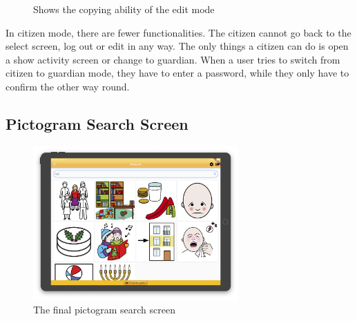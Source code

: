 \begin{figure}%
    \centering
    \quad
    \caption{Shows the copying ability of the edit mode}%
    \label{fig:finalCopyEditModeFisk}%
\end{figure}

In \gls{citizen} mode, there are fewer functionalities. The \gls{citizen} cannot go back to the select screen, log out or edit in any way. The only things a \gls{citizen} can do is open a show activity screen or change to \gls{guardian}. When a user tries to switch from citizen to \gls{guardian} mode, they have to enter a password, while they only have to confirm the other way round.

\subsection{Pictogram Search Screen}

\begin{figure}[H]
    \begin{center}
        \includegraphics[width=0.7\textwidth]{figures/FinalScreen/addPictogramScreen.png}
    \end{center}
    \caption{The final pictogram search screen}
    \label{fig:finalPictogramSeach}
\end{figure}

